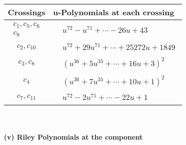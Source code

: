 \documentclass[1p]{elsarticle_modified}
\theoremstyle{definition}
\begin{document}
\begin{tabular}{m{50pt}|m{274pt}}
Crossings & \hspace{64pt}u-Polynomials at each crossing \\
\hline $$\begin{aligned}c_{1},c_{5},c_{6}\\c_{9}\end{aligned}$$&$\begin{aligned}
&u^{72}- u^{71}+\cdots-26 u+43
\end{aligned}$\\
\hline $$\begin{aligned}c_{2},c_{10}\end{aligned}$$&$\begin{aligned}
&u^{72}+29 u^{71}+\cdots+25272 u+1849
\end{aligned}$\\
\hline $$\begin{aligned}c_{3},c_{8}\end{aligned}$$&$\begin{aligned}
&(u^{36}+5 u^{35}+\cdots+16 u+3)^{2}
\end{aligned}$\\
\hline $$\begin{aligned}c_{4}\end{aligned}$$&$\begin{aligned}
&(u^{36}+7 u^{35}+\cdots+10 u+1)^{2}
\end{aligned}$\\
\hline $$\begin{aligned}c_{7},c_{11}\end{aligned}$$&$\begin{aligned}
&u^{72}-2 u^{71}+\cdots-22 u+1
\end{aligned}$\\
\hline
\end{tabular}\\~\\
\newpage\renewcommand{\arraystretch}{1}
\flushleft \textbf{(v) Riley Polynomials at the component}\newline \\
\end{document}
